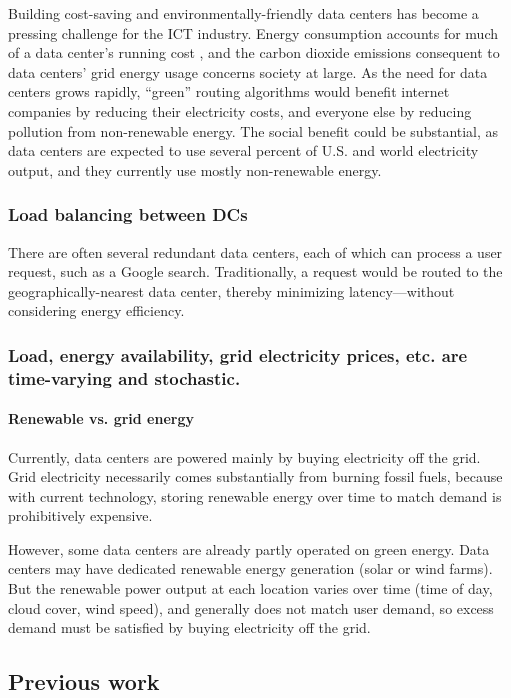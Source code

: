 \documentclass{acm_proc_article-sp}
\begin{document}
		Building cost-saving and environmentally-friendly data centers has become a pressing challenge for the ICT industry.
		Energy consumption accounts for much of a data center’s running cost \cite{datacenter}, and the carbon dioxide emissions consequent to data centers’ grid energy usage concerns society at large.
		As the need for data centers grows rapidly,
		“green” routing algorithms would benefit internet companies by reducing their electricity costs, and everyone else by reducing pollution from non-renewable energy. The social benefit could be substantial, as data centers are expected to use several percent of U.S. and world electricity output, and they currently use mostly non-renewable energy.
	
	\subsubsection{Load balancing between DCs}
		There are often several redundant data centers, each of which can process a user request, such as a Google search. Traditionally, a request would be routed to the geographically-nearest data center, thereby minimizing latency—without considering energy efficiency.
	\subsubsection{Load, energy availability, grid electricity prices, etc. are time-varying and stochastic.}
		\paragraph{Renewable vs. grid energy}
			Currently, data centers are powered mainly by buying electricity off the grid. Grid electricity necessarily comes substantially from burning fossil fuels, because with current technology, storing renewable energy over time to match demand is prohibitively expensive.
			
			However, some data centers are already partly operated on green energy. Data centers may have dedicated renewable energy generation (solar or wind farms). But the renewable power output at each location varies over time (time of day, cloud cover, wind speed), and generally does not match user demand, so excess demand must be satisfied by buying electricity off the grid.


\subsection{Previous work}
\end{document}
